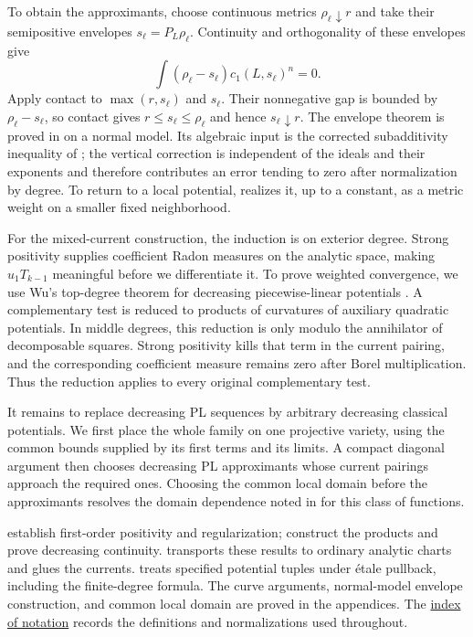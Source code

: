 \documentclass[11pt,reqno]{amsart}
\theoremstyle{definition}
\theoremstyle{remark}
\numberwithin{equation}{section}
\begin{document}
To obtain the approximants, choose continuous metrics
$\rho_\ell\downarrow r$ and take their semipositive envelopes
$s_\ell=P_L\rho_\ell$. Continuity and orthogonality of these envelopes
give
\[
 \int (\rho_\ell-s_\ell)c_1(L,s_\ell)^n=0.
\]
Apply contact to $\max(r,s_\ell)$ and $s_\ell$. Their nonnegative gap
is bounded by $\rho_\ell-s_\ell$, so contact gives
$r\leq s_\ell\leq\rho_\ell$ and hence $s_\ell\downarrow r$.
The envelope theorem is proved in  on a
normal model. Its algebraic input is the corrected subadditivity
inequality of ; the vertical correction is
independent of the ideals and their exponents and therefore contributes
an error tending to zero after normalization by degree. To return to
a local potential,  realizes it, up to a
constant, as a metric weight on a smaller fixed neighborhood.

For the mixed-current construction, the induction is on exterior
degree. Strong positivity supplies coefficient Radon measures on the
analytic space, making $u_1T_{k-1}$ meaningful before we differentiate
it. To prove weighted convergence, we use Wu's top-degree theorem for
decreasing piecewise-linear potentials
\cite[Theorem~4.2(4)]{Wu}. A complementary test is reduced to products
of curvatures of auxiliary quadratic potentials. In middle degrees,
this reduction is only modulo the annihilator of decomposable squares.
Strong positivity kills that term in the current pairing, and the
corresponding coefficient measure remains zero after Borel
multiplication. Thus the reduction applies to every original
complementary test.

It remains to replace decreasing PL sequences by arbitrary decreasing
classical potentials. We first place the whole family on one projective
variety, using the common bounds supplied by its first terms and its
limits. A compact diagonal argument then chooses decreasing PL
approximants whose current pairings approach the required ones. Choosing
the common local domain before the approximants resolves the domain
dependence noted in \cite[Remark~4.6]{Wu} for this class of functions.

 establish first-order positivity and
regularization;  construct
the products and prove decreasing continuity. 
transports these results to ordinary analytic charts and glues the
currents.  treats specified potential tuples under
\'etale pullback, including the finite-degree formula. The curve
arguments, normal-model envelope construction, and common local domain
are proved in the appendices. The
\hyperref[sec:notation]{index of notation} records the definitions and
normalizations used throughout.
\end{document}
